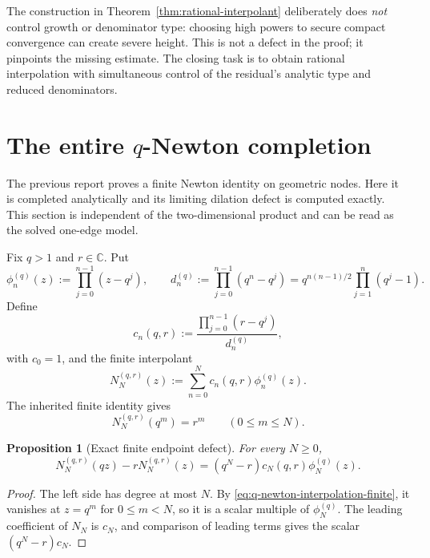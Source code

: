 \documentclass[11pt]{article}
\newtheorem{proposition}[theorem]{Proposition}
\theoremstyle{definition}
\newcommand{\C}{\mathbb C}
\begin{document}
The construction in Theorem~\ref{thm:rational-interpolant} deliberately does \emph{not} control growth or denominator type: choosing high powers to secure compact convergence can create severe height.  This is not a defect in the proof; it pinpoints the missing estimate.  The closing task is to obtain rational interpolation with simultaneous control of the residual's analytic type and reduced denominators.

\section{The entire \texorpdfstring{\(q\)}{q}-Newton completion}\label{sec:q-newton}

The previous report proves a finite Newton identity on geometric nodes.  Here it is completed analytically and its limiting dilation defect is computed exactly.  This section is independent of the two-dimensional product and can be read as the solved one-edge model.

Fix \(q>1\) and \(r\in\C\).  Put
\[
  \phi_n^{(q)}(z):=\prod_{j=0}^{n-1}(z-q^j),
  \qquad
  d_n^{(q)}:=\prod_{j=0}^{n-1}(q^n-q^j)
   =q^{n(n-1)/2}\prod_{j=1}^n(q^j-1).
\]
Define
\begin{equation}\label{eq:q-newton-coeff}
  c_n(q,r):=
  \frac{\prod_{j=0}^{n-1}(r-q^j)}{d_n^{(q)}},
\end{equation}
with \(c_0=1\), and the finite interpolant
\begin{equation}\label{eq:q-newton-finite}
  N_N^{(q,r)}(z):=\sum_{n=0}^N c_n(q,r)\phi_n^{(q)}(z).
\end{equation}
The inherited finite identity gives
\begin{equation}\label{eq:q-newton-interpolation-finite}
  N_N^{(q,r)}(q^m)=r^m
  \qquad(0\le m\le N).
\end{equation}

\begin{proposition}[Exact finite endpoint defect]\label{prop:finite-q-defect}
For every \(N\ge0\),
\begin{equation}\label{eq:finite-q-defect}
  N_N^{(q,r)}(qz)-rN_N^{(q,r)}(z)
   =(q^N-r)c_N(q,r)\phi_N^{(q)}(z).
\end{equation}
\end{proposition}

\begin{proof}
The left side has degree at most \(N\).  By \eqref{eq:q-newton-interpolation-finite}, it vanishes at \(z=q^m\) for \(0\le m<N\), so it is a scalar multiple of \(\phi_N^{(q)}\).  The leading coefficient of \(N_N\) is \(c_N\), and comparison of leading terms gives the scalar \((q^N-r)c_N\).
\end{proof}
\end{document}
